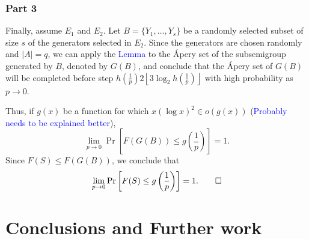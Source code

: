 \subsubsection*{Part 3}

\par Finally, assume $E_1$ and $E_2$. Let $B = \{Y_{1}, \ldots, Y_{s}\}$ be a randomly selected subset of size $s$ of the generators selected in $E_2$.  Since the generators are chosen randomly and $|A| = q$, we can apply the \textcolor{blue}{Lemma} to the Ápery set of the subsemigroup generated by $B$, denoted by $G(B)$, and conclude that the Ápery set of $G(B)$ will be completed before step $h\left(\frac{1}{p}\right)2\left\lfloor 3\log_2 h\left(\frac{1}{p}\right)\right\rfloor$ with high probability as $p \to 0$. 
\par Thus, if $g(x)$ be a function for which $x(\log x)^2 \in o(g(x))$ (\textcolor{blue}{Probably needs to be explained better}),
\[\lim_{p \to  0} \Pr\left[F(G(B)) \leq g\left(\frac{1}{p}\right)\right] = 1.\]
Since $F(S) \leq F(G(B))$, we conclude that
\[\lim_{p \to 0}\Pr\left[F(S) \leq g\left(\frac{1}{p}\right)\right] = 1. \qed \] 


\section{Conclusions and Further work}
